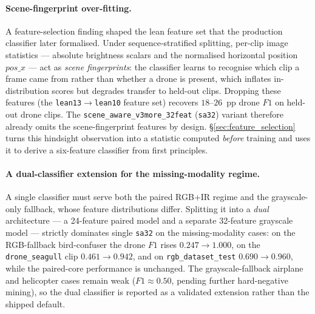 \documentclass[12pt,a4paper,oneside,openright]{book}
\begin{document}
\paragraph{Scene-fingerprint over-fitting.}
A feature-selection finding shaped the lean feature set that the production classifier later formalised. Under sequence-stratified splitting, per-clip image statistics --- absolute brightness scalars and the normalised horizontal position $\mathit{pos\_x}$ --- act as \emph{scene fingerprints}: the classifier learns to recognise which clip a frame came from rather than whether a drone is present, which inflates in-distribution scores but degrades transfer to held-out clips. Dropping these features (the \texttt{lean13}$\to$\texttt{lean10} feature set) recovers $18$--$26$~pp drone $F1$ on held-out drone clips. The \texttt{scene\_aware\_v3more\_32feat} (\texttt{sa32}) variant therefore already omits the scene-fingerprint features by design. \S\ref{sec:feature_selection} turns this hindsight observation into a statistic computed \emph{before} training and uses it to derive a six-feature classifier from first principles.

\paragraph{A dual-classifier extension for the missing-modality regime.}
A single classifier must serve both the paired RGB+IR regime and the grayscale-only fallback, whose feature distributions differ. Splitting it into a \emph{dual} architecture --- a 24-feature paired model and a separate 32-feature grayscale model --- strictly dominates single \texttt{sa32} on the missing-modality cases: on the RGB-fallback bird-confuser the drone $F1$ rises $0.247\to1.000$, on the \texttt{drone\_seagull} clip $0.461\to0.942$, and on \texttt{rgb\_dataset\_test} $0.690\to0.960$, while the paired-core performance is unchanged. The grayscale-fallback airplane and helicopter cases remain weak ($F1\approx0.50$, pending further hard-negative mining), so the dual classifier is reported as a validated extension rather than the shipped default.
\end{document}
